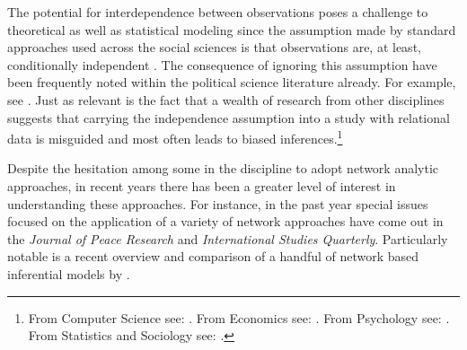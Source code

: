 The potential for interdependence between observations poses a challenge to theoretical as well as statistical modeling since the assumption made by standard approaches used across the social sciences is that observations are, at least, conditionally independent \citep{snijders:2011}. The consequence of ignoring this assumption have been frequently noted within the political science literature already. For example, see \citet{beck:etal:1998,signorino:1999,hoff:ward:2004,franzese:hayes:2007,cranmer:desmarais:2011,erikson:pinto:2014}.  Just as relevant is the fact that a wealth of research from other disciplines suggests that carrying the independence assumption into a study with relational data is misguided and most often leads to biased inferences.\footnote{From Computer Science see: \citet{bonabeau:2002,brandes:erlebach:2005}. From Economics see: \citet{goyal:2012,jackson:2014}. From Psychology see: \citet{pattison:wasserman:1999,kenny:etal:2006}. From Statistics and Sociology see: \citet{snijders:1996,hoff:etal:2002}.} 


Despite the hesitation among some in the discipline to adopt network analytic approaches, in recent years there has been a greater level of interest in understanding these approaches. For instance, in the past year special issues focused on the application of a variety of network approaches have come out in the \textit{Journal of Peace Research} and \textit{International Studies Quarterly}. Particularly notable is a recent overview and comparison of a handful of network based inferential models by \citet{cranmer:etal:2016}.


